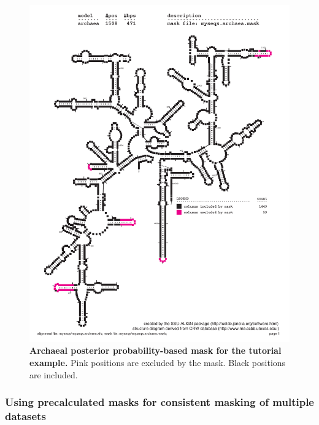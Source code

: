 \begin{figure}
  \begin{center}
\includegraphics[width=5.7in]{Figures/myseqs-archaea-mask}
  \end{center}
\caption{\textbf{Archaeal posterior probability-based mask for the
    tutorial example.}
  Pink positions are excluded by the mask. Black positions are
  included.}
\label{fig:myseqs-archaea-mask}
\end{figure}

\subsubsection{Using precalculated masks for consistent masking of
  multiple datasets}

